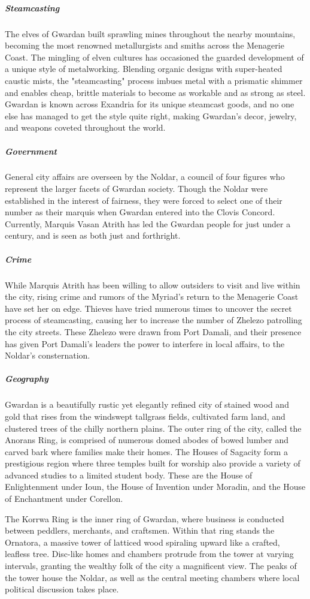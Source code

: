\documentclass[10pt,a4paper,twoside,bg=print,twocolumn,openany,nodeprecatedcode]{dndbook}
\begin{document}
\subparagraph{Steamcasting}
The elves of Gwardan built sprawling mines throughout the nearby mountains, becoming the most renowned metallurgists and smiths across the Menagerie Coast. The mingling of elven cultures has occasioned the guarded development of a unique style of metalworking. Blending organic designs with super-heated caustic mists, the "steamcasting" process imbues metal with a prismatic shimmer and enables cheap, brittle materials to become as workable and as strong as steel. Gwardan is known across Exandria for its unique steamcast goods, and no one else has managed to get the style quite right, making Gwardan's decor, jewelry, and weapons coveted throughout the world.

\subparagraph{Government}
General city affairs are overseen by the Noldar, a council of four figures who represent the larger facets of Gwardan society. Though the Noldar were established in the interest of fairness, they were forced to select one of their number as their marquis when Gwardan entered into the Clovis Concord. Currently, Marquis Vasan Atrith has led the Gwardan people for just under a century, and is seen as both just and forthright.

\subparagraph{Crime}
While Marquis Atrith has been willing to allow outsiders to visit and live within the city, rising crime and rumors of the Myriad's return to the Menagerie Coast have set her on edge. Thieves have tried numerous times to uncover the secret process of steamcasting, causing her to increase the number of Zhelezo patrolling the city streets. These Zhelezo were drawn from Port Damali, and their presence has given Port Damali's leaders the power to interfere in local affairs, to the Noldar's consternation.

\subparagraph{Geography}
Gwardan is a beautifully rustic yet elegantly refined city of stained wood and gold that rises from the windswept tallgrass fields, cultivated farm land, and clustered trees of the chilly northern plains. The outer ring of the city, called the Anorans Ring, is comprised of numerous domed abodes of bowed lumber and carved bark where families make their homes. The Houses of Sagacity form a prestigious region where three temples built for worship also provide a variety of advanced studies to a limited student body. These are the House of Enlightenment under Ioun, the House of Invention under Moradin, and the House of Enchantment under Corellon.

The Korrwa Ring is the inner ring of Gwardan, where business is conducted between peddlers, merchants, and craftsmen. Within that ring stands the Ornatora, a massive tower of latticed wood spiraling upward like a crafted, leafless tree. Disc-like homes and chambers protrude from the tower at varying intervals, granting the wealthy folk of the city a magnificent view. The peaks of the tower house the Noldar, as well as the central meeting chambers where local political discussion takes place.
\end{document}
